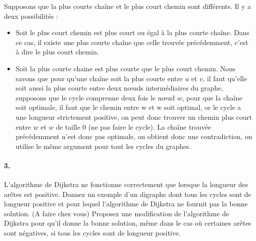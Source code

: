 \begin{solution}
  Supposons que la plus courte chaîne et le plus court chemin sont différents. Il y a deux possibilités :
  \begin{itemize}
    \item Soit le plus court chemin est plus court ou égal à la plus courte chaîne. Dans ce cas, il existe une plus courte chaîne que celle trouvée précédemment, c'est à dire le plus court chemin.
    \item Soit la plus courte chaine est plus courte que le plus court chemin.
      Nous savons que pour qu'une chaîne soit la plus courte entre $u$ et $v$,
      il faut qu'elle soit aussi la plus courte entre deux nœuds intermédiaires du graphe,
      supposons que le cycle comprenne deux fois le nœud $w$,
      pour que la chaîne soit optimale, il faut que le chemin entre w et w soit optimal,
      or le cycle a une longueur strictement positive,
      on peut donc trouver un chemin plus court entre $w$ et $w$ de taille 0 (ne pas faire le cycle).
      La chaîne trouvée précédemment n'est donc pas optimale, on obtient donc une contradiction,
      on utilise le même argument pour tout les cycles du graphes.
  \end{itemize}
\end{solution}

\paragraph{3. } L'algorithme de Dijkstra ne fonctionne correctement que lorsque la longueur des arêtes est positive. Donnez un exemple d'un digraphe dont tous les cycles sont de longueur positive et pour lequel l'algorithme de Dijkstra ne fournit pas la bonne solution. (A faire chez vous) Proposez une modification de l'algorithme de Dijkstra pour qu'il donne la bonne solution, même dans le cas où certaines arêtes sont négatives, si tous les cycles sont de longueur positive.


